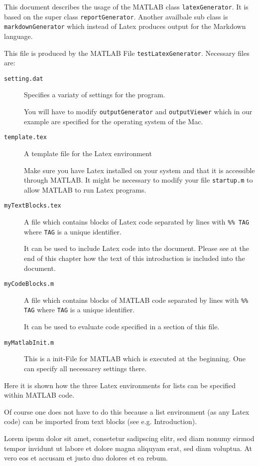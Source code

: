 This document describes the usage of the MATLAB class {\tt latexGenerator}.
It is based on the super class {\tt reportGenerator}. Another availbale sub class
is {\tt markdownGenerator} which instead of Latex produces output for the
Markdown language.

This file is produced by the MATLAB File {\tt testLatexGenerator}.
Necessary files are:

\begin{description}
\item[{\tt setting.dat}] Specifies a variaty of settings for the program.

You will have to modify {\tt outputGenerator} and {\tt outputViewer} which 
in our example are specified for the operating system of the Mac.

\item[{\tt template.tex}] A template file for the Latex environment

Make sure you have Latex installed on your system and that it is accessible 
through MATLAB. It might be necessary to modify your file {\tt startup.m} 
to allow MATLAB to run Latex programs.

\item[{\tt myTextBlocks.tex}] A file which contains blocks of Latex code 
separated by lines with {\tt \%\% TAG} where {\tt TAG} is a unique identifier.

It can be used to include Latex code into the document. Please see at the 
end of this chapter how the text of this introduction is included into the document.

\item[{\tt myCodeBlocks.m}] A file which contains blocks of MATLAB code 
separated by lines with {\tt \%\% TAG} where {\tt TAG} is a unique identifier.

It can be used to evaluate code specified in a section of this file. 

\item[{\tt myMatlabInit.m}] This is a init-File for MATLAB which is executed 
at the beginning. One can specify all necessarey settings there.

\end{description}

Here it is shown how the three Latex environments for lists can be
specified within MATLAB code.

Of course one does not have to do this because a list environment 
(as any Latex code) can be imported from text blocks (see e.g. Introduction).

Lorem ipsum dolor sit amet, consetetur sadipscing elitr, sed diam nonumy 
eirmod tempor invidunt ut labore et dolore magna aliquyam erat, sed diam 
voluptua. At vero eos et accusam et justo duo dolores et ea rebum. 